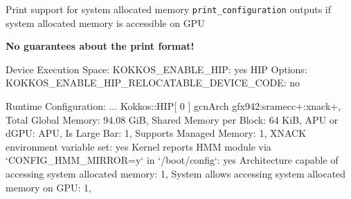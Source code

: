 \begin{frame}[fragile]{Print support for system allocated memory}
  \texttt{print\_configuration} outputs if system allocated memory is accessible on GPU
  \begin{center}
    \textbf{No guarantees about the print format!}
  \end{center}

  \vspace{5pt}

  \begin{code}
    Device Execution Space:
      KOKKOS_ENABLE_HIP: yes
    HIP Options:
      KOKKOS_ENABLE_HIP_RELOCATABLE_DEVICE_CODE: no
    
    Runtime Configuration:
      ...
    Kokkos::HIP[ 0 ] gcnArch gfx942:sramecc+:xnack+, Total Global Memory: 94.08 GiB,
    Shared Memory per Block: 64 KiB,
    APU or dGPU: APU, Is Large Bar: 1, Supports Managed Memory: 1,
    XNACK environment variable set: yes
    Kernel reports HMM module via `CONFIG_HMM_MIRROR=y` in `/boot/config`: yes
    Architecture capable of accessing system allocated memory: 1,
    System allows accessing system allocated memory on GPU: 1,
  \end{code}
    
\end{frame}
